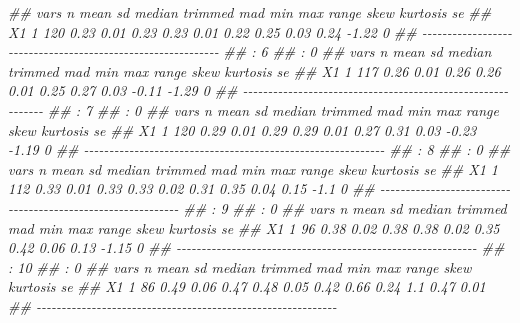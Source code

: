 \documentclass[
  10pt,
  a4paper,
]{book}
\newenvironment{Shaded}{\begin{snugshade}}{\end{snugshade}}
\newcommand{\DocumentationTok}[1]{\textcolor[rgb]{0.37,0.37,0.37}{\textit{#1}}}
\begin{document}
\begin{Shaded}
\begin{Highlighting}[]
\DocumentationTok{\#\#    vars   n mean   sd median trimmed  mad  min  max range skew kurtosis se}
\DocumentationTok{\#\# X1    1 120 0.23 0.01   0.23    0.23 0.01 0.22 0.25  0.03 0.24    {-}1.22  0}
\DocumentationTok{\#\# {-}{-}{-}{-}{-}{-}{-}{-}{-}{-}{-}{-}{-}{-}{-}{-}{-}{-}{-}{-}{-}{-}{-}{-}{-}{-}{-}{-}{-}{-}{-}{-}{-}{-}{-}{-}{-}{-}{-}{-}{-}{-}{-}{-}{-}{-}{-}{-}{-}{-}{-}{-}{-}{-}{-}{-}{-}{-}{-}{-} }
\DocumentationTok{\#\# : 6}
\DocumentationTok{\#\# : 0}
\DocumentationTok{\#\#    vars   n mean   sd median trimmed  mad  min  max range  skew kurtosis se}
\DocumentationTok{\#\# X1    1 117 0.26 0.01   0.26    0.26 0.01 0.25 0.27  0.03 {-}0.11    {-}1.29  0}
\DocumentationTok{\#\# {-}{-}{-}{-}{-}{-}{-}{-}{-}{-}{-}{-}{-}{-}{-}{-}{-}{-}{-}{-}{-}{-}{-}{-}{-}{-}{-}{-}{-}{-}{-}{-}{-}{-}{-}{-}{-}{-}{-}{-}{-}{-}{-}{-}{-}{-}{-}{-}{-}{-}{-}{-}{-}{-}{-}{-}{-}{-}{-}{-} }
\DocumentationTok{\#\# : 7}
\DocumentationTok{\#\# : 0}
\DocumentationTok{\#\#    vars   n mean   sd median trimmed  mad  min  max range  skew kurtosis se}
\DocumentationTok{\#\# X1    1 120 0.29 0.01   0.29    0.29 0.01 0.27 0.31  0.03 {-}0.23    {-}1.19  0}
\DocumentationTok{\#\# {-}{-}{-}{-}{-}{-}{-}{-}{-}{-}{-}{-}{-}{-}{-}{-}{-}{-}{-}{-}{-}{-}{-}{-}{-}{-}{-}{-}{-}{-}{-}{-}{-}{-}{-}{-}{-}{-}{-}{-}{-}{-}{-}{-}{-}{-}{-}{-}{-}{-}{-}{-}{-}{-}{-}{-}{-}{-}{-}{-} }
\DocumentationTok{\#\# : 8}
\DocumentationTok{\#\# : 0}
\DocumentationTok{\#\#    vars   n mean   sd median trimmed  mad  min  max range skew kurtosis se}
\DocumentationTok{\#\# X1    1 112 0.33 0.01   0.33    0.33 0.02 0.31 0.35  0.04 0.15     {-}1.1  0}
\DocumentationTok{\#\# {-}{-}{-}{-}{-}{-}{-}{-}{-}{-}{-}{-}{-}{-}{-}{-}{-}{-}{-}{-}{-}{-}{-}{-}{-}{-}{-}{-}{-}{-}{-}{-}{-}{-}{-}{-}{-}{-}{-}{-}{-}{-}{-}{-}{-}{-}{-}{-}{-}{-}{-}{-}{-}{-}{-}{-}{-}{-}{-}{-} }
\DocumentationTok{\#\# : 9}
\DocumentationTok{\#\# : 0}
\DocumentationTok{\#\#    vars  n mean   sd median trimmed  mad  min  max range skew kurtosis se}
\DocumentationTok{\#\# X1    1 96 0.38 0.02   0.38    0.38 0.02 0.35 0.42  0.06 0.13    {-}1.15  0}
\DocumentationTok{\#\# {-}{-}{-}{-}{-}{-}{-}{-}{-}{-}{-}{-}{-}{-}{-}{-}{-}{-}{-}{-}{-}{-}{-}{-}{-}{-}{-}{-}{-}{-}{-}{-}{-}{-}{-}{-}{-}{-}{-}{-}{-}{-}{-}{-}{-}{-}{-}{-}{-}{-}{-}{-}{-}{-}{-}{-}{-}{-}{-}{-} }
\DocumentationTok{\#\# : 10}
\DocumentationTok{\#\# : 0}
\DocumentationTok{\#\#    vars  n mean   sd median trimmed  mad  min  max range skew kurtosis   se}
\DocumentationTok{\#\# X1    1 86 0.49 0.06   0.47    0.48 0.05 0.42 0.66  0.24  1.1     0.47 0.01}
\DocumentationTok{\#\# {-}{-}{-}{-}{-}{-}{-}{-}{-}{-}{-}{-}{-}{-}{-}{-}{-}{-}{-}{-}{-}{-}{-}{-}{-}{-}{-}{-}{-}{-}{-}{-}{-}{-}{-}{-}{-}{-}{-}{-}{-}{-}{-}{-}{-}{-}{-}{-}{-}{-}{-}{-}{-}{-}{-}{-}{-}{-}{-}{-} }

\end{Highlighting}
\end{Shaded}
\end{document}
